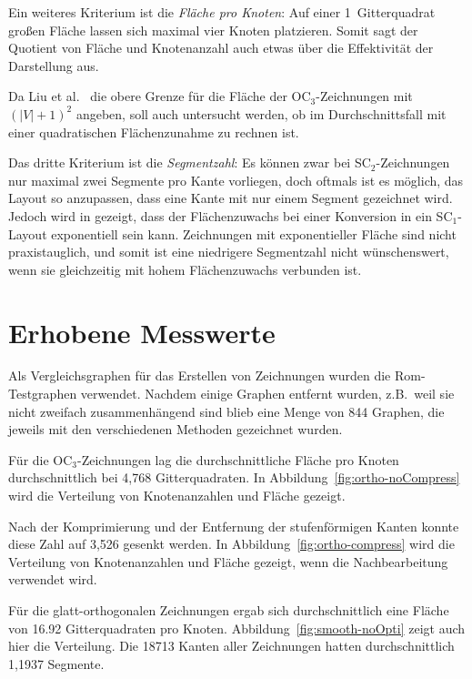 \documentclass[a4paper]{scrreprt}
\theoremstyle{definition}
\begin{document}
Ein weiteres Kriterium ist die \emph{Fläche pro Knoten}: Auf einer 1~Gitterquadrat großen Fläche lassen sich maximal vier Knoten platzieren. Somit sagt der Quotient von Fläche und Knotenanzahl auch etwas über die Effektivität der Darstellung aus.

Da Liu et al.~\cite{liu+etal-98} die obere Grenze für die Fläche der OC$_3$-Zeichnungen mit $(|V|+1)^2$ angeben, soll auch untersucht werden, ob im Durchschnittsfall mit einer quadratischen Flächenzunahme zu rechnen ist.

Das dritte Kriterium ist die \emph{Segmentzahl}: Es können zwar bei SC$_2$-Zeichnungen nur maximal zwei Segmente pro Kante vorliegen, doch oftmals ist es möglich, das Layout so anzupassen, dass eine Kante mit nur einem Segment gezeichnet wird.  Jedoch wird in \cite{bekos-13} gezeigt, dass der Flächenzuwachs bei einer Konversion in ein SC$_1$-Layout exponentiell sein kann. Zeichnungen mit exponentieller Fläche sind nicht praxistauglich, und somit ist eine niedrigere Segmentzahl nicht wünschenswert, wenn sie gleichzeitig mit hohem Flächenzuwachs verbunden ist.

\section{Erhobene Messwerte}

Als Vergleichsgraphen für das Erstellen von Zeichnungen wurden die Rom-Testgraphen verwendet. Nachdem einige Graphen entfernt wurden, z.B.\ weil sie nicht zweifach zusammenhängend sind blieb eine Menge von 844 Graphen, die jeweils mit den verschiedenen Methoden gezeichnet wurden.%

Für die OC$_3$-Zeichnungen lag die durchschnittliche Fläche pro Knoten durchschnittlich bei 4,768 Gitterquadraten. In Abbildung~\ref{fig:ortho-noCompress} wird die Verteilung von Knotenanzahlen und Fläche gezeigt.

Nach der Komprimierung und der Entfernung der stufenförmigen Kanten konnte diese Zahl auf 3,526 gesenkt werden. In Abbildung~\ref{fig:ortho-compress} wird die Verteilung von Knotenanzahlen und Fläche gezeigt, wenn die Nachbearbeitung verwendet wird.

Für die glatt-orthogonalen Zeichnungen ergab sich durchschnittlich eine Fläche von 16.92 Gitterquadraten pro Knoten. Abbildung~\ref{fig:smooth-noOpti} zeigt auch hier die Verteilung. Die 18713 Kanten aller Zeichnungen hatten durchschnittlich 1,1937 Segmente.

\end{document}
